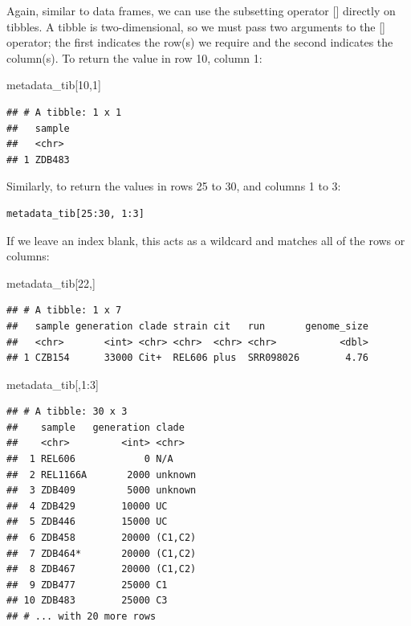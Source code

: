 \documentclass[
]{book}
\newenvironment{Shaded}{\begin{snugshade}}{\end{snugshade}}
\newcommand{\DecValTok}[1]{\textcolor[rgb]{0.00,0.00,0.81}{#1}}
\newcommand{\NormalTok}[1]{#1}
\newcommand{\SpecialCharTok}[1]{\textcolor[rgb]{0.00,0.00,0.00}{#1}}
\begin{document}
Again, similar to data frames, we can use the subsetting operator {[}{]} directly on tibbles. A tibble is two-dimensional, so we must pass two arguments to the {[}{]} operator; the first indicates the row(s) we require and the second indicates the column(s). To return the value in row 10, column 1:

\begin{Shaded}
\begin{Highlighting}[]
\NormalTok{metadata\_tib[}\DecValTok{10}\NormalTok{,}\DecValTok{1}\NormalTok{]}
\end{Highlighting}
\end{Shaded}

\begin{verbatim}
## # A tibble: 1 x 1
##   sample
##   <chr> 
## 1 ZDB483
\end{verbatim}

Similarly, to return the values in rows 25 to 30, and columns 1 to 3:

\begin{verbatim}
metadata_tib[25:30, 1:3]
\end{verbatim}

If we leave an index blank, this acts as a wildcard and matches all of the rows or columns:

\begin{Shaded}
\begin{Highlighting}[]
\NormalTok{metadata\_tib[}\DecValTok{22}\NormalTok{,]}
\end{Highlighting}
\end{Shaded}

\begin{verbatim}
## # A tibble: 1 x 7
##   sample generation clade strain cit   run       genome_size
##   <chr>       <int> <chr> <chr>  <chr> <chr>           <dbl>
## 1 CZB154      33000 Cit+  REL606 plus  SRR098026        4.76
\end{verbatim}

\begin{Shaded}
\begin{Highlighting}[]
\NormalTok{metadata\_tib[,}\DecValTok{1}\SpecialCharTok{:}\DecValTok{3}\NormalTok{]}
\end{Highlighting}
\end{Shaded}

\begin{verbatim}
## # A tibble: 30 x 3
##    sample   generation clade  
##    <chr>         <int> <chr>  
##  1 REL606            0 N/A    
##  2 REL1166A       2000 unknown
##  3 ZDB409         5000 unknown
##  4 ZDB429        10000 UC     
##  5 ZDB446        15000 UC     
##  6 ZDB458        20000 (C1,C2)
##  7 ZDB464*       20000 (C1,C2)
##  8 ZDB467        20000 (C1,C2)
##  9 ZDB477        25000 C1     
## 10 ZDB483        25000 C3     
## # ... with 20 more rows
\end{verbatim}
\end{document}
